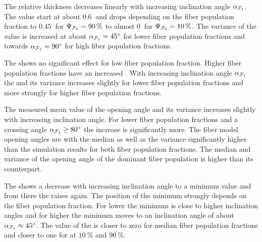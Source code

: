 \par
The relative thickness \trel{} decreases linearly with increasing inclination angle $\textnormal{$\alpha$}_{\textnormal{$\mathcal{F}_1$}}$.
The \trel{} value start at about $\SI{0.6}{}$ and drops depending on the fiber population fraction \modelPsi{} to $\SI{0.45}{}$ for $\textnormal{$\Psi_{\textnormal{$\mathcal{F}_0$}}$}=\SI{90}{\percent}$ to almost $\SI{0}{}$ for $\textnormal{$\Psi_{\textnormal{$\mathcal{F}_0$}}$}=\SI{10}{\percent}$.
The variance of the \trel{} value is increased at about $\textnormal{$\alpha$}_{\textnormal{$\mathcal{F}_1$}}=\SI{45}{\degree}$ for lower fiber population fractions and towards $\textnormal{$\alpha$}_{\textnormal{$\mathcal{F}_1$}}=\SI{90}{\degree}$ for high fiber population fractions.
\par
The \rvalue{} shows no significant effect for low fiber population fraction.
Higher fiber population fractions have an increased \rvalue{}.
With increasing inclination angle $\textnormal{$\alpha$}_{\textnormal{$\mathcal{F}_1$}}$ the \rvalue{} and its variance increases slightly for lower fiber population fractions and more strongly for higher fiber population fractions.
\par
The measured mean value of the opening angle \openingAngle{} and its variance increases slightly with increasing inclination angle.
For lower fiber population fractions and a crossing angle $\textnormal{$\alpha$}_{\textnormal{$\mathcal{F}_1$}} \geq \SI{80}{\degree}$ the increase is significantly more.
The fiber model opening angles are with the median as well as the \bvariance{} variance significantly higher than the simulation results for both fiber population fractions.
The median and \bvariance{} variance of the opening angle of the dominant fiber population is higher than its counterpart.
\par
The \accvalue{} shows a decrease with increasing inclination angle to a minimum value and from there the \accvalue{} raises again.
The position of the minimum strongly depends on the fiber population fraction.
For lower \modelPsi{} the minimum is close to higher inclination angles and for higher \modelPsi{} the minimum moves to an inclination angle of about $\textnormal{$\alpha$}_{\textnormal{$\mathcal{F}_1$}} \approx \SI{45}{\degree}$.
The value of the \accvalue{} is closer to zero for median fiber population fractions and closer to one for \modelPsi{} at $\SI{10}{\percent}$ and $\SI{90}{\percent}$.
%
%
%
